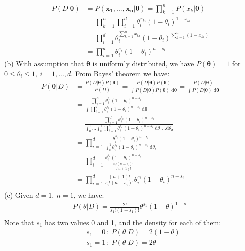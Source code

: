 \documentclass[12pt]{article}
\begin{document}
\begin{equation*}
\begin{aligned}
P(D|\bm{\theta})&=P(\bm{x_1},...,\bm{x_n}|\bm{\theta}) = \prod_{k=1}^n P(x_k|\bm{\theta})\\ &= \prod_{k=1}^n \prod^d_{i=1} \theta_i^{x_{ki}}(1-\theta_i)^{1-x_{ki}} \\ &= \prod^d_{i=1} \theta_i^{\sum_{k=1}^n x_{ki}}(1-\theta_i)^{\sum_{k=1}^n (1-x_{ki})}\\ &= \prod^d_{i=1} \theta_i^{s_i}(1-\theta_i)^{n-s_i}
\end{aligned}
\end{equation*}
\noindent(b) With assumption that $\bm{\theta}$ is uniformly distributed, we have $P(\bm{\theta})=1$ for $0\leq \theta_i \leq1,\ i=1,...,d$. From Bayes' theorem we have:
\begin{equation*}
\begin{aligned}
P(\bm{\theta}|D)&=\frac{P(D|\bm{\theta})P(\bm{\theta})}{P(D)} =\frac{P(D|\bm{\theta})P(\bm{\theta})}{\int P(D|\bm{\theta})P(\bm{\theta})\text{ d}\bm{\theta}}= \frac{P(D|\bm{\theta})}{\int P(D|\bm{\theta})\text{ d}\bm{\theta}}\\
&= \frac{\prod^d_{i=1} \theta_i^{s_i}(1-\theta_i)^{n-s_i}}{\int \prod^d_{i=1} \theta_i^{s_i}(1-\theta_i)^{n-s_i}\text{ d}\bm{\theta}}\\
&=\frac{\prod^d_{i=1} \theta_i^{s_i}(1-\theta_i)^{n-s_i}}{\int_0^1 ... \int_0^1 \prod^d_{i=1} \theta_i^{s_i}(1-\theta_i)^{n-s_i}\text{ d}\theta_1...\text{d}\theta_d}\\
&=\prod_{i=1}^{d} \frac{\theta_i^{s_i}(1-\theta_i)^{n-s_i}}{\int_0^1 \theta_i^{s_i}(1-\theta_i)^{n-s_i}\text{ d}\theta_i}\\
&=\prod_{i=1}^{d} \frac{\theta_i^{s_i}(1-\theta_i)^{n-s_i}}{\frac{s_i!(n-s_i)!}{(n+1)!}}\\
&=\prod_{i=1}^{d} \frac{(n+1)!}{s_i!(n-s_i)!}\theta_i^{s_i}(1-\theta_i)^{n-s_i}\\
\end{aligned}
\end{equation*}
(c) Given $d=1,\ n=1$, we have: 
\begin{equation*}
\begin{aligned}
P(\theta|D)= \frac{2!}{s_1!(1-s_1)!}\theta^{s_1}(1-\theta)^{1-s_1}\\
\end{aligned}
\end{equation*}
Note that $s_1$ has two values 0 and 1, and the density for each of them:
\begin{equation*}
\begin{aligned}
&s_1 = 0\ :\ P(\theta|D)= 2(1-\theta)\\
&s_1 = 1\ :\ P(\theta|D)= 2\theta\\
\end{aligned}
\end{equation*}
\end{document}
